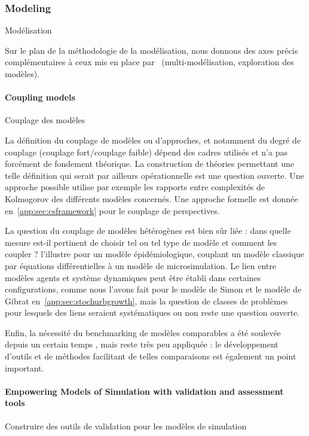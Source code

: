 \subsubsection*{Modeling}{Modélisation}

Sur le plan de la méthodologie de la modélisation, nous donnons des axes précis complémentaires à ceux mis en place par~\cite{pumain2017urban} (multi-modélisation, exploration des modèles).


\paragraph{Coupling models}{Couplage des modèles}


La définition du couplage de modèles ou d'approches, et notamment du degré de couplage (couplage fort/couplage faible) dépend des cadres utilisés et n'a pas forcément de fondement théorique. La construction de théories permettant une telle définition qui serait par ailleurs opérationnelle est une question ouverte. Une approche possible utilise par exemple les rapports entre complexités de Kolmogorov des différents modèles concernés. Une approche formelle est donnée en~\ref{app:sec:csframework} pour le couplage de perspectives.


La question du couplage de modèles hétérogènes est bien sûr liée : dans quelle mesure est-il pertinent de choisir tel ou tel type de modèle et comment les coupler ? \cite{banos2015coupling} l'illustre pour un modèle épidémiologique, couplant un modèle classique par équations différentielles à un modèle de microsimulation. Le lien entre modèles agents et système dynamiques peut être établi dans certaines configurations, comme nous l'avons fait pour le modèle de Simon et le modèle de Gibrat en~\ref{app:sec:stochurbgrowth}, mais la question de classes de problèmes pour lesquels des liens seraient systématiques ou non reste une question ouverte.


Enfin, la nécessité du benchmarking de modèles comparables a été soulevée depuis un certain temps \cite{axtell1996aligning}, mais reste très peu appliquée : le développement d'outils et de méthodes facilitant de telles comparaisons est également un point important.



\paragraph{Empowering Models of Simulation with validation and assessment tools}{Construire des outils de validation pour les modèles de simulation}


